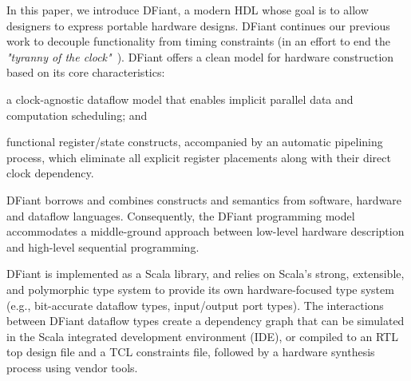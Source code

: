 In this paper, we introduce DFiant, a modern HDL whose goal is to allow designers to express portable hardware designs.
DFiant continues our previous work\cite{Port2015} to decouple functionality from timing constraints (in an effort to end the \emph{"tyranny of the clock"}~\cite{Sutherland2012}). DFiant offers a clean model for hardware construction based on its core characteristics:
\begin{enumerate*}[label=(\roman*)]
\item
  a clock-agnostic dataflow model that enables implicit parallel data and computation scheduling; and 
\item
  functional register/state constructs, accompanied by an automatic pipelining process, which eliminate all explicit register placements along with their direct clock dependency.
\end{enumerate*} DFiant borrows and combines constructs and semantics from software, hardware and dataflow languages. Consequently, the DFiant programming model accommodates a middle-ground approach between low-level hardware description and high-level sequential programming. 

DFiant is implemented as a Scala library, and relies on Scala's strong, extensible, and polymorphic type system to provide its own hardware-focused type system (e.g., bit-accurate dataflow types, input/output port types). The interactions between DFiant dataflow types create a dependency graph that can be simulated in the Scala integrated development environment (IDE), or compiled to an RTL top design file and a TCL constraints file, followed by a hardware synthesis process using vendor tools.


 


